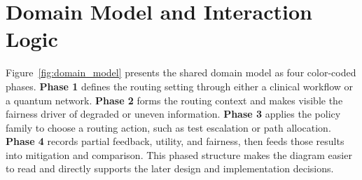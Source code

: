 \documentclass{IEEEtran}
\begin{document}
\section{Domain Model and Interaction Logic}
Figure~\ref{fig:domain_model} presents the shared domain model as four color-coded phases. \textbf{Phase 1} defines the routing setting through either a clinical workflow or a quantum network. \textbf{Phase 2} forms the routing context and makes visible the fairness driver of degraded or uneven information. \textbf{Phase 3} applies the policy family to choose a routing action, such as test escalation or path allocation. \textbf{Phase 4} records partial feedback, utility, and fairness, then feeds those results into mitigation and comparison. This phased structure makes the diagram easier to read and directly supports the later design and implementation decisions.
\end{document}
